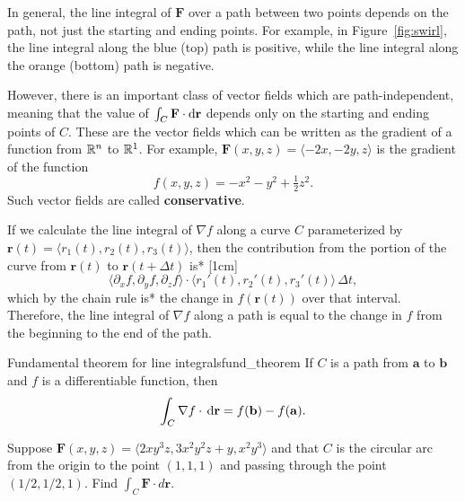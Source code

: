 \documentclass{watsonbook}
\begin{document}
In general, the line integral of $\mathbf{F}$ over a path between two
points depends on the path, not just the starting and ending points.
For example, in Figure~\ref{fig:swirl}, the line integral along the
blue (top) path is positive, while the line integral along the orange
(bottom) path is negative.

However, there is an important class of vector fields which are
path-independent, meaning that the value of $\int_C \mathbf{F} \cdot
\mathrm{d}\mathbf{r}$ depends only on the starting and ending points of $C$.
These are the vector fields which can be written as the gradient of a
function from $\mathbb{R}^n$ to $\mathbb{R}^1$. For example, $\mathbf{F}(x,y,z) =
\langle -2x, -2y, z \rangle$ is the gradient of the function
\[
  f(x,y,z) = -x^2-y^2 + \tfrac{1}{2}z^2. 
\]
Such vector fields are called \textbf{conservative}. 

If we calculate the line integral of $\nabla f$ along a curve $C$
parameterized by $\mathbf{r}(t) = \langle r_1(t), r_2(t), r_3(t) \rangle$,
then the contribution from the portion of the curve from
$\mathbf{r}(t)$ to $\mathbf{r}(t+\Delta t)$ is*
[1cm]
\[
  \langle \partial_x f, \partial_y f, \partial_z f \rangle \cdot
  \langle r_1'(t), r_2'(t), r_3'(t) \rangle \, \Delta t, 
\]
which by the chain rule is* the change in $f(\mathbf{r}(t))$ over that
interval. Therefore, the line integral of $\nabla f$ along a path is
equal to the change in $f$ from the beginning to the end of the path.

\begin{theo}{Fundamental theorem for line integrals}{fund_theorem}
  If $C$ is a path from $\mathbf{a}$ to $\mathbf{b}$ and $f$ is a
  differentiable function, then 
  \[
    \int_C \nabla f \cdot \, {\mathrm{d}}\mathbf{r} = f(\mathbf{b}) - f(\mathbf{a}). 
  \]
\end{theo}

\begin{example}{}{}
  Suppose $\mathbf{F}(x,y,z) = \langle 2  x y^{3} z, 3  x^{2} y^{2}
  z + y, x^{2} y^{3} \rangle$ and that $C$ is the circular arc from the
  origin to the point $(1,1,1)$ and passing through the point
  $(1/2,1/2,1)$. Find $\int_C \mathbf{F} \cdot d \mathbf{r}$. 
\end{example}
\end{document}
